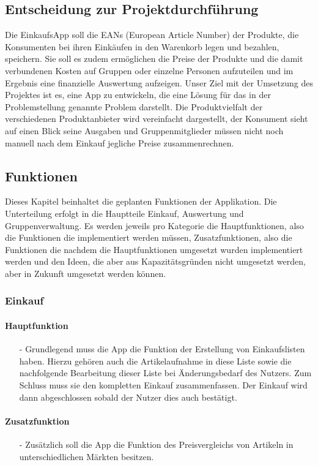 \documentclass[12pt,a4paper]{article}
\begin{document}
\subsection{Entscheidung zur Projektdurchführung}
Die EinkaufsApp soll die EANs (European Article Number) der Produkte, die Konsumenten bei ihren Einkäufen in den Warenkorb legen und bezahlen, speichern.
Sie soll es zudem ermöglichen die Preise der Produkte und die damit verbundenen Kosten auf Gruppen oder einzelne Personen aufzuteilen und im Ergebnis eine finanzielle Auswertung aufzeigen.
Unser Ziel mit der Umsetzung des Projektes ist es, eine App zu entwickeln, die eine Lösung für das in der Problemstellung genannte Problem darstellt. 
Die Produktvielfalt der verschiedenen Produktanbieter wird vereinfacht dargestellt, der Konsument sieht auf einen Blick seine Ausgaben und Gruppenmitglieder müssen nicht noch manuell nach dem Einkauf jegliche Preise zusammenrechnen.

\newpage

\subsection{Funktionen}
Dieses Kapitel beinhaltet die geplanten Funktionen der Applikation. Die Unterteilung erfolgt in die Hauptteile Einkauf, Auswertung und Gruppenverwaltung. Es werden jeweils pro Kategorie die Hauptfunktionen, also die Funktionen die implementiert werden müssen, Zusatzfunktionen, also die Funktionen die nachdem die Hauptfunktionen umgesetzt wurden implementiert werden und den Ideen, die aber aus Kapazitätsgründen nicht umgesetzt werden, aber in Zukunft umgesetzt werden können.
\subsubsection{Einkauf}
\paragraph{Hauptfunktion}
\begin{itemize}
\item[-] Grundlegend muss die App die Funktion der Erstellung von Einkaufslisten haben. Hierzu gehören auch die Artikelaufnahme in diese Liste sowie die nachfolgende Bearbeitung dieser Liste bei Änderungsbedarf des Nutzers. Zum Schluss muss sie den kompletten Einkauf zusammenfassen. Der Einkauf wird dann abgeschlossen sobald der Nutzer dies auch bestätigt.
\end{itemize}
\paragraph{Zusatzfunktion}
\begin{itemize}
\item[-]Zusätzlich soll die App die Funktion des Preisvergleichs von Artikeln in unterschiedlichen Märkten besitzen.
\end {itemize}
\end{document}
